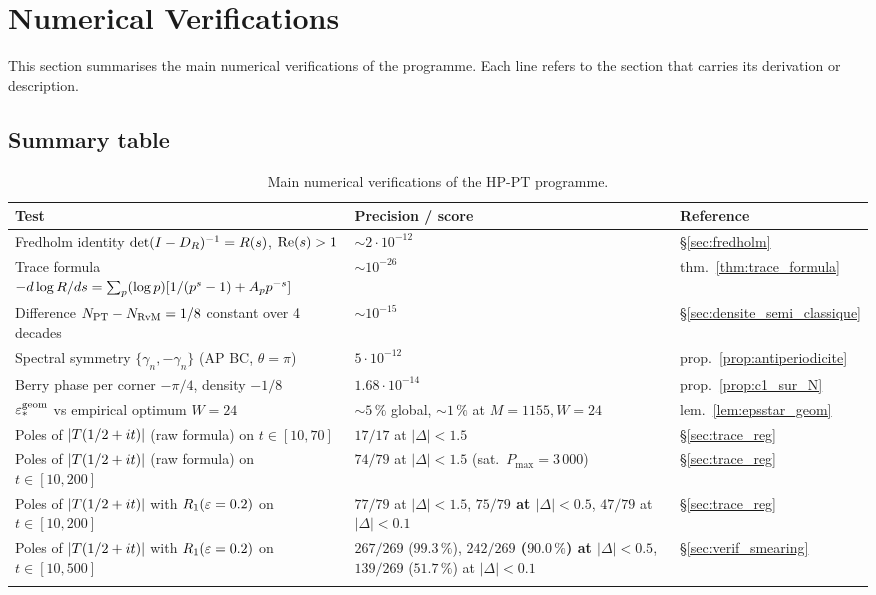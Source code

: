 \section{Numerical Verifications}
\label{sec:verifications_numeriques}

This section summarises the main numerical verifications of the
programme. Each line refers to the section that carries its
derivation or description.

\subsection{Summary table}
\label{sec:verif_table}

\begin{longtable}{@{}p{6.5cm}p{4.5cm}p{3cm}@{}}
\toprule
\textbf{Test} & \textbf{Precision / score} & \textbf{Reference}\\
\midrule
\endhead
Fredholm identity $\det(I - D_R)^{-1} = R(s)$, $\operatorname{Re}(s) > 1$
 & $\sim 2 \cdot 10^{-12}$ & \S\ref{sec:fredholm}\\
Trace formula $-d\log R/ds = \sum_p (\log p)[1/(p^s-1) + A_p p^{-s}]$
 & $\sim 10^{-26}$ & thm.~\ref{thm:trace_formula}\\
Difference $N_{\mathrm{PT}} - N_{\mathrm{RvM}} = 1/8$ constant over 4 decades
 & $\sim 10^{-15}$ & \S\ref{sec:densite_semi_classique}\\
Spectral symmetry $\{\gamma_n, -\gamma_n\}$ (AP BC, $\theta = \pi$)
 & $5 \cdot 10^{-12}$ & prop.~\ref{prop:antiperiodicite}\\
Berry phase per corner $-\pi/4$, density $-1/8$
 & $1.68 \cdot 10^{-14}$ & prop.~\ref{prop:c1_sur_N}\\
$\varepsilon_{*}^{\mathrm{geom}}$ vs empirical optimum $W = 24$
 & $\sim 5\,\%$ global, $\sim 1\,\%$ at $M = 1155, W = 24$
 & lem.~\ref{lem:epsstar_geom}\\
Poles of $|T(1/2 + it)|$ (raw formula) on $t \in [10, 70]$
 & $17/17$ at $|\Delta| < 1.5$
 & \S\ref{sec:trace_reg}\\
Poles of $|T(1/2 + it)|$ (raw formula) on $t \in [10, 200]$
 & $74/79$ at $|\Delta| < 1.5$ (sat.~$P_{\max} = 3\,000$)
 & \S\ref{sec:trace_reg}\\
Poles of $|T(1/2 + it)|$ with $R_1(\varepsilon = 0.2)$ on $t \in [10, 200]$
 & $77/79$ at $|\Delta| < 1.5$, \textbf{$75/79$ at $|\Delta| < 0.5$}, $47/79$ at $|\Delta| < 0.1$
 & \S\ref{sec:trace_reg}\\
Poles of $|T(1/2 + it)|$ with $R_1(\varepsilon = 0.2)$ on $t \in [10, 500]$
 & $267/269$ ($99.3\,\%$), \textbf{$242/269$ ($90.0\,\%$) at $|\Delta| < 0.5$}, $139/269$ ($51.7\,\%$) at $|\Delta| < 0.1$
 & \S\ref{sec:verif_smearing}\\
\bottomrule
\caption{Main numerical verifications of the HP-PT programme.}
\label{tab:verifs_numeriques}
\end{longtable}

